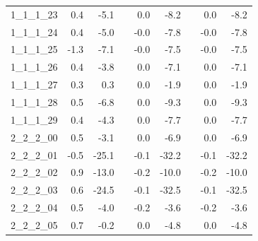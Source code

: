 \begin{longtable}{lrrcrrcrr}
1\_1\_1\_23      &                 0.4 &                  -5.1 &&                  0.0 &                   -8.2 &&                  0.0 &                   -8.2 \\
1\_1\_1\_24      &                 0.4 &                  -5.0 &&                 -0.0 &                   -7.8 &&                 -0.0 &                   -7.8 \\
1\_1\_1\_25      &                -1.3 &                  -7.1 &&                 -0.0 &                   -7.5 &&                 -0.0 &                   -7.5 \\
1\_1\_1\_26      &                 0.4 &                  -3.8 &&                  0.0 &                   -7.1 &&                  0.0 &                   -7.1 \\
1\_1\_1\_27      &                 0.3 &                   0.3 &&                  0.0 &                   -1.9 &&                  0.0 &                   -1.9 \\
1\_1\_1\_28      &                 0.5 &                  -6.8 &&                  0.0 &                   -9.3 &&                  0.0 &                   -9.3 \\
1\_1\_1\_29      &                 0.4 &                  -4.3 &&                  0.0 &                   -7.7 &&                  0.0 &                   -7.7 \\
2\_2\_2\_00      &                 0.5 &                  -3.1 &&                  0.0 &                   -6.9 &&                  0.0 &                   -6.9 \\
2\_2\_2\_01      &                -0.5 &                 -25.1 &&                 -0.1 &                  -32.2 &&                 -0.1 &                  -32.2 \\
2\_2\_2\_02      &                 0.9 &                 -13.0 &&                 -0.2 &                  -10.0 &&                 -0.2 &                  -10.0 \\
2\_2\_2\_03      &                 0.6 &                 -24.5 &&                 -0.1 &                  -32.5 &&                 -0.1 &                  -32.5 \\
2\_2\_2\_04      &                 0.5 &                  -4.0 &&                 -0.2 &                   -3.6 &&                 -0.2 &                   -3.6 \\
2\_2\_2\_05      &                 0.7 &                  -0.2 &&                  0.0 &                   -4.8 &&                  0.0 &                   -4.8 \\

\end{longtable}
